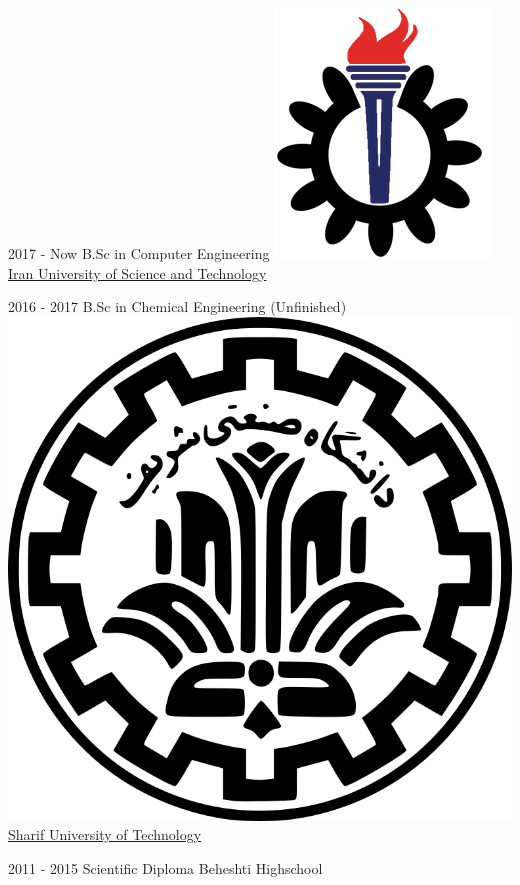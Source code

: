 \documentclass[a4paper]{friggeri-cv}
\begin{document}
    \begin{entrylist}
        \entry
        {2017 - Now}
        {     B.Sc in Computer Engineering}
        {\href{http://www.iust.ac.ir/}{\includegraphics[scale=0.08]{../assets/images/logos/IUST_logo_color.png}Iran University of Science and Technology}}
        {}

        \entry
        {2016 - 2017}
        {    B.Sc in Chemical Engineering (Unfinished)}
        {\href{http://www.sharif.ir/}{\includegraphics[scale=0.015]{../assets/images/logos/Sharif_logo.png} Sharif University of Technology}}
        {}

        \entry
        {2011 - 2015}
        {    Scientific Diploma}
        {Beheshti Highschool}
        {}
    \end{entrylist}
\end{document}
